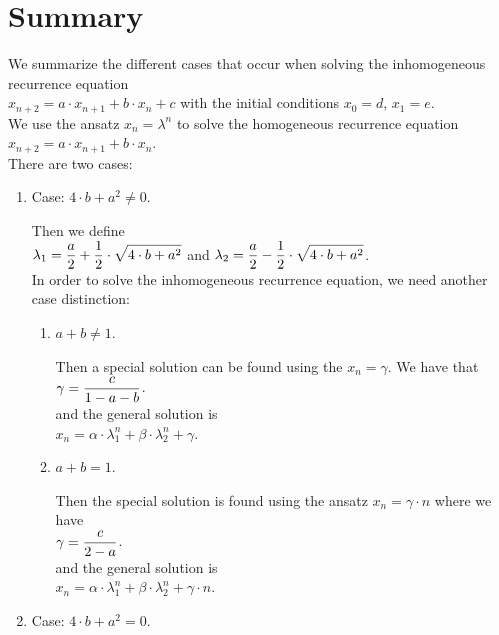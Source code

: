 \section{Summary}
We summarize the different cases that occur when solving the inhomogeneous recurrence equation
\\[0.2cm]
\hspace*{1.3cm}
$x_{n+2} = a \cdot x_{n+1} + b \cdot x_n + c$ \quad with the initial  conditions \quad $x_0 = d$, $x_1 = e$.
\\[0.2cm]
We use the ansatz $x_n = \lambda^n$ to solve the homogeneous recurrence equation
\\[0.2cm]
\hspace*{1.3cm}
$x_{n+2} = a \cdot x_{n+1} + b \cdot x_n$.
\\[0.2cm]
There are two cases:
\begin{enumerate}
\item Case: $4 \cdot b + a^2 \not= 0$.

      Then we define
      \\[0.2cm]
      \hspace*{1.3cm}
      $\displaystyle\lambda_1 = \frac{a}{2} + \frac{1}{2} \cdot \sqrt{4 \cdot b + a^2}$ \quad and \quad
      $\displaystyle\lambda_2 = \frac{a}{2} - \frac{1}{2} \cdot \sqrt{4 \cdot b + a^2}$.
      \\[0.2cm]
      In order to solve the inhomogeneous recurrence equation, we need another case distinction:
      \begin{enumerate}
      \item $a + b \not= 1$.
        
            Then a special solution can be found using the   $x_n = \gamma$.
            We have that
            \\[0.2cm]
            \hspace*{1.3cm}
            $\displaystyle \gamma = \frac{c}{1 - a - b}$.
            \\[0.2cm]
            and the general solution is
            \\[0.2cm]
            \hspace*{1.3cm}
            $x_n = \alpha \cdot \lambda_1^n + \beta \cdot \lambda_2^n + \gamma$.
      \item $a + b = 1$.

            Then the special solution is found using the ansatz $x_n = \gamma \cdot n$ where we have
            \\[0.2cm]
            \hspace*{1.3cm}
            $\displaystyle \gamma = \frac{c}{2 - a}$.
            \\[0.2cm]
            and the general
            solution is
            \\[0.2cm]
            \hspace*{1.3cm}
            $x_n = \alpha \cdot \lambda_1^n + \beta \cdot \lambda_2^n + \gamma \cdot n$.
      \end{enumerate}
\item Case: $4 \cdot b + a^2 = 0$.


\end{enumerate}
